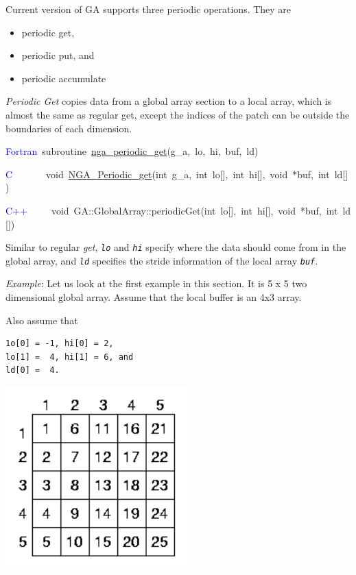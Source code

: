 Current version of GA supports three periodic operations. They are
\begin{itemize}
\item periodic get, 
\item periodic put, and 
\item periodic accumulate
\end{itemize}
\emph{Periodic Get }copies data from a global array section to a local
array, which is almost the same as regular get, except the indices
of the patch can be outside the boundaries of each dimension.

\textcolor{blue}{Fortran}~subroutine~\href{https://hpc.pnl.gov/globalarrays/api/f_op_api.html\#ga_periodic_get}{nga\_{}periodic\_{}get}(g\_a,~lo,~hi,~buf,~ld)~

\textcolor{blue}{C}~~~~~~~void~\href{https://hpc.pnl.gov/globalarrays/api/c_op_api.html\#ga_periodic_get}{NGA\_{}Periodic\_{}get}(int~g\_a,~int~lo{[}{]},~int~hi{[}{]},~void~{*}buf,~int~ld{[}{]})~

\textcolor{blue}{C++}~~~~~void~GA::GlobalArray::periodicGet(int~lo{[}{]},~int~hi{[}{]},~void~{*}buf,~int~ld{[}{]})

Similar to regular \emph{get}, \texttt{\emph{lo}} and \texttt{\emph{hi}}
specify where the data should come from in the global array, and \texttt{\emph{ld}}
specifies the stride information of the local array \texttt{\emph{buf}}.

\emph{Example}: Let us look at the first example in this section.
It is 5 x 5 two dimensional global array. Assume that the local buffer
is an 4x3 array. 

Also assume that
\begin{verbatim}
1o[0] = -1, hi[0] = 2,
lo[1] =  4, hi[1] = 6, and
ld[0] =  4.
\end{verbatim}
\includegraphics[width=7cm]{periodic1}

